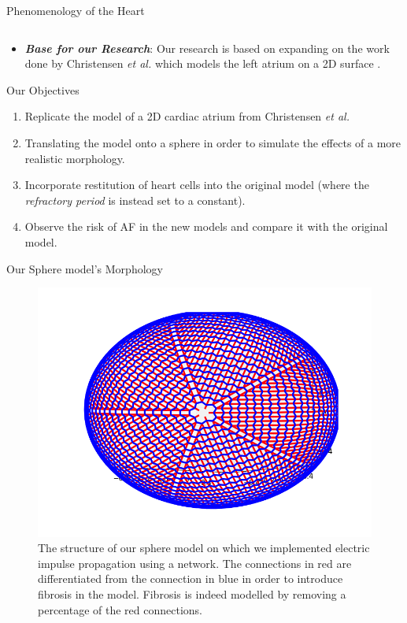 \documentclass[final,hyperref={pdfpagelabels=false}]{beamer}
\begin{document}
\begin{frame}[t]
\begin{columns}[t]
\begin{column}{.465\textwidth}
\begin{block}{Phenomenology of the Heart}
\begin{columns}
\begin{column}{.54\textwidth}
	
	
\end{column}

\end{columns}

	\begin{itemize}
	
	
 \item \textbf{\textit{Base for our Research}}: Our research is based on expanding on the work done by Christensen \emph{et al.} which models the left atrium on a 2D surface \cite{Christensen}.
	\end{itemize}
\end{block}
\begin{block}{Our Objectives}

\begin{enumerate}
\item Replicate the model of a 2D cardiac atrium from Christensen \emph{et al.}
\item  Translating the model onto a sphere in order to simulate the effects of a more realistic morphology. 
\item Incorporate restitution of heart cells into the original model (where the \textit{refractory period} is instead set to a constant).
\item Observe the risk of AF in the new models and compare it with the original model.
\end{enumerate}


\end{block}


\begin{block}{Our Sphere model's Morphology}

\begin{figure}
\includegraphics[width=0.6\linewidth]{connectome}
\caption{The structure of our sphere model on which we implemented electric impulse propagation using a network. The connections in red are differentiated from the connection in blue in order to introduce fibrosis in the model. Fibrosis is indeed modelled by removing a percentage of the red connections. }
\end{figure}


\end{block}
\end{column}
\end{columns}
\end{frame}
\end{document}
